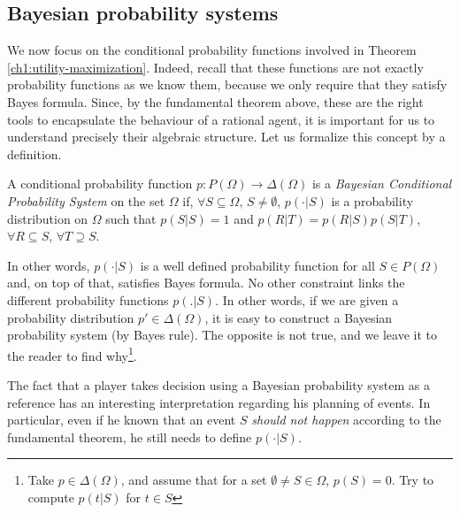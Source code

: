 \subsection{Bayesian probability systems}

We now focus on the conditional probability functions involved in Theorem \ref{ch1:utility-maximization}.
Indeed, recall that these functions are not exactly probability functions as we know them, because we only require that they satisfy Bayes formula.
Since, by the fundamental theorem above, these are the right tools to encapsulate the behaviour of a rational agent,
it is important for us to understand precisely their algebraic structure.
Let us formalize this concept by a definition.

\begin{definition}
A conditional probability function $p: P(\Omega) \rightarrow \Delta(\Omega)$ is a \emph{Bayesian Conditional Probability System} on the set $\Omega$ if, $\forall S \subseteq \Omega, \, S \neq \emptyset$, $p(\cdot|S)$ is a probability distribution on $\Omega$ such that $p(S|S) = 1$ and $p(R|T) = p(R|S) p(S|T)$, $\forall R \subseteq S$, $\forall T \supseteq S.$
\end{definition}

In other words, $p(\cdot|S)$  is a well defined probability function for all $S \in P(\Omega)$ and, on top of that, satisfies Bayes formula. No other constraint links the different probability functions $p(.|S)$.
In other words,  if we are given a probability distribution $p' \in \Delta(\Omega)$, it is easy to construct a Bayesian probability system (by Bayes rule). The opposite is not true, and we leave it to the reader to find why\footnote{Take $p \in \Delta(\Omega)$, and assume that for a set $\emptyset \neq S \in \Omega$, $p(S) = 0$. Try to compute $p(t|S)$ for $t \in S$}.

The fact that a player takes decision using a Bayesian probability system as a reference has an interesting interpretation regarding his planning of events. In particular, even if he known that  an event $S$ \emph{should not happen} according to the fundamental theorem, he still needs to define $p(\cdot|S)$.

